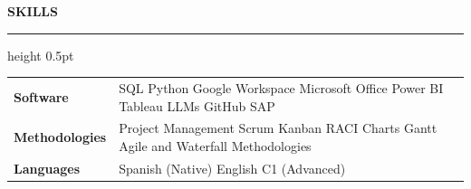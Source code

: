\documentclass[12pt, a4paper]{article}
\newcommand{\seccion}[1]{%
  \vspace{7pt}%
  {\large\bfseries #1}%
  \vspace{1pt}%
  \hrule height 0.5pt%
  \vspace{2pt}%
}
\begin{document}
\seccion{SKILLS}

\begin{tabularx}{\textwidth}{@{} >{\bfseries}l X @{}}
  Software      & SQL \textbullet{} Python \textbullet{} Google Workspace \textbullet{}
                  Microsoft Office \textbullet{} Power BI \textbullet{} Tableau \textbullet{}
                  LLMs \textbullet{} GitHub \textbullet{} SAP \\[3pt]
  Methodologies & Project Management \textbullet{} Scrum \textbullet{} Kanban \textbullet{}
                  RACI Charts \textbullet{} Gantt \textbullet{} Agile and Waterfall
                  Methodologies \\[3pt]
  Languages     & Spanish (Native) \textbullet{} English C1 (Advanced) \\
\end{tabularx}

\end{document}
